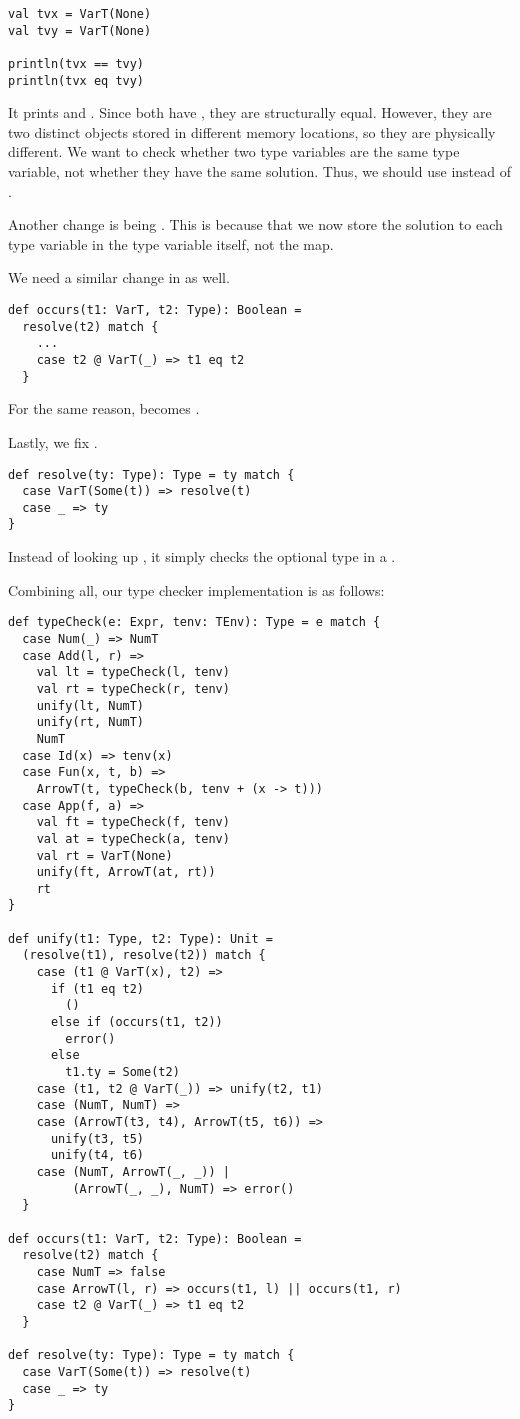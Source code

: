 \begin{verbatim}
val tvx = VarT(None)
val tvy = VarT(None)

println(tvx == tvy)
println(tvx eq tvy)
\end{verbatim}

It prints  and . Since both have , they are
structurally equal. However, they are two distinct  objects stored in
different memory locations, so they are physically different. We want to check
whether two type variables are the same type variable, not whether they have the
same solution. Thus, we should use  instead of \code{==}.

Another change is  being . This is
because that we now store the solution to each type variable in the type
variable itself, not the  map.

We need a similar change in  as well.

\begin{verbatim}
def occurs(t1: VarT, t2: Type): Boolean =
  resolve(t2) match {
    ...
    case t2 @ VarT(_) => t1 eq t2
  }
\end{verbatim}

For the same reason, \code{==} becomes .

Lastly, we fix .

\begin{verbatim}
def resolve(ty: Type): Type = ty match {
  case VarT(Some(t)) => resolve(t)
  case _ => ty
}
\end{verbatim}

Instead of looking up , it simply checks the optional type in a
.

Combining all, our type checker implementation is as follows:

\begin{verbatim}
def typeCheck(e: Expr, tenv: TEnv): Type = e match {
  case Num(_) => NumT
  case Add(l, r) =>
    val lt = typeCheck(l, tenv)
    val rt = typeCheck(r, tenv)
    unify(lt, NumT)
    unify(rt, NumT)
    NumT
  case Id(x) => tenv(x)
  case Fun(x, t, b) =>
    ArrowT(t, typeCheck(b, tenv + (x -> t)))
  case App(f, a) =>
    val ft = typeCheck(f, tenv)
    val at = typeCheck(a, tenv)
    val rt = VarT(None)
    unify(ft, ArrowT(at, rt))
    rt
}

def unify(t1: Type, t2: Type): Unit =
  (resolve(t1), resolve(t2)) match {
    case (t1 @ VarT(x), t2) =>
      if (t1 eq t2)
        ()
      else if (occurs(t1, t2))
        error()
      else
        t1.ty = Some(t2)
    case (t1, t2 @ VarT(_)) => unify(t2, t1)
    case (NumT, NumT) =>
    case (ArrowT(t3, t4), ArrowT(t5, t6)) =>
      unify(t3, t5)
      unify(t4, t6)
    case (NumT, ArrowT(_, _)) |
         (ArrowT(_, _), NumT) => error()
  }

def occurs(t1: VarT, t2: Type): Boolean =
  resolve(t2) match {
    case NumT => false
    case ArrowT(l, r) => occurs(t1, l) || occurs(t1, r)
    case t2 @ VarT(_) => t1 eq t2
  }

def resolve(ty: Type): Type = ty match {
  case VarT(Some(t)) => resolve(t)
  case _ => ty
}
\end{verbatim}

